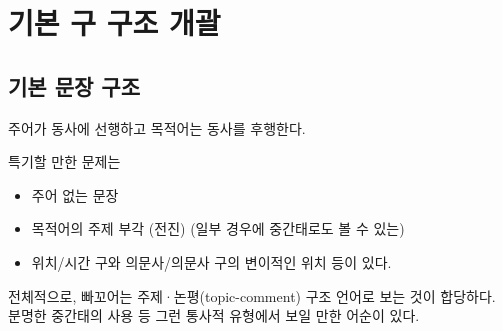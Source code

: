 \section{기본 구 구조 개괄}
\subsection{기본 문장 구조}
주어가 동사에 선행하고 목적어는 동사를 후행한다.

특기할 만한 문제는 
\begin{itemize}
\item 주어 없는 문장
\item 목적어의 주제 부각 (전진) (일부 경우에 중간태로도 볼 수 있는)
\item 위치/시간 구와 의문사/의문사 구의 변이적인 위치 등이 있다.
\end{itemize}

전체적으로, 빠꼬어는 주제·논평(topic-comment) 구조 언어로 보는 것이 합당하다. 분명한 중간태의 사용 등 그런 통사적 유형에서 보일 만한 어순이 있다.

